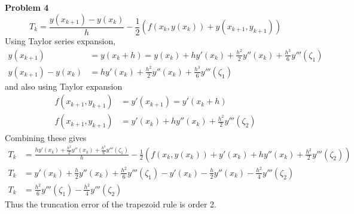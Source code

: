 \documentclass{article} %
\begin{document}
\textbf{Problem 4} \\
\begin{equation*}
T_k = \frac{y(x_{k+1})-y(x_k)}{h} - \frac{1}{2}(f(x_k, y(x_k)) + y(x_{k+1}, y_{k+1})) 
\end{equation*}
Using Taylor series expansion,
\begin{align*}
y(x_{k+1}) &= y(x_k+h) = y(x_k) + h y'(x_k) + \frac{h^2}{2}y''(x_k) + \frac{h^3}{6}y'''(\zeta_1) \\
y(x_{k+1}) -y(x_k) &=  h y'(x_k) + \frac{h^2}{2}y''(x_k) + \frac{h^3}{6}y'''(\zeta_1)
\end{align*}
and also using Taylor expansion
\begin{align*}
f(x_{k+1}, y_{k+1}) &= y'(x_{k+1})= y'(x_{k}+h) \\
f(x_{k+1}, y_{k+1}) &= y'(x_k) + hy''(x_k) + \frac{h^2}{2}y'''(\zeta_2)
\end{align*}
Combining these gives
\begin{align*}
T_k &= \frac{h y'(x_k) + \frac{h^2}{2}y''(x_k) + \frac{h^3}{6}y'''(\zeta_1)}{h} - \frac{1}{2}(f(x_k, y(x_k)) + y'(x_k) + hy''(x_k) + \frac{h^2}{2}y'''(\zeta_2)) \\
T_k &= y'(x_k) + \frac{h}{2}y''(x_k) + \frac{h^2}{6}y'''(\zeta_1) - y'(x_k) - \frac{h}{2}y''(x_k) - \frac{h^2}{4}y'''(\zeta_2) \\
T_k &= \frac{h^2}{6}y'''(\zeta_1) - \frac{h^2}{4}y'''(\zeta_2)
\end{align*}
Thus the truncation error of the trapezoid rule is order 2.
\\
\end{document}
